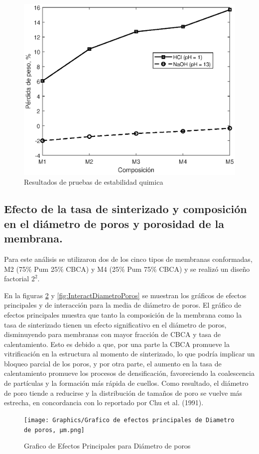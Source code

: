 \documentclass{article}
\begin{document}
\begin{figure}[ht]
    \centering
    \includegraphics[width=0.5\linewidth]{Graphics/ChemStability.eps}
    \caption{Resultados de pruebas de estabilidad quimica}
    \label{fig:EstabilidadQuimica}
\end{figure}

\subsection{Efecto de la tasa de sinterizado y composición en el diámetro de poros y porosidad de la membrana. }

Para este análisis se utilizaron dos de los cinco tipos de membranas 
conformadas, M2 (75\% Pum 25\% CBCA) y M4 (25\% Pum 75\% CBCA) y se 
realizó un diseño factorial $2^2$.

En la figuras \ref{fig:EfectosPrinDiametroPoros} y \ref{fig:InteractDiametroPoros} 
se muestran los gráficos de efectos principales 
y de interacción para la media de diámetro de poros. El gráfico de 
efectos principales muestra que tanto la composición de la membrana 
como la tasa de sinterizado tienen un efecto significativo en el 
diámetro de poros, disminuyendo para membranas con mayor fracción de 
CBCA y tasa de calentamiento. Esto es debido a que, por una parte la 
CBCA promueve la vitrificación en la estructura al momento de 
sinterizado, lo que podría implicar un bloqueo parcial de los poros, 
y por otra parte, el aumento en la tasa de calentamiento promueve los 
procesos de densificación, favoreciendo la coalescencia de partículas 
y la formación más rápida de cuellos. Como resultado, el diámetro de 
poro tiende a reducirse y la distribución de tamaños de poro se 
vuelve más estrecha, en concordancia con lo reportado por Chu et al. (1991). 

\begin{figure}[ht]
    \centering
    \texttt{[image: Graphics/Grafico de efectos principales de Diametro de poros, μm.png]}
    \caption{Grafico de Efectos Principales para Diámetro de poros}
    \label{fig:EfectosPrinDiametroPoros}
\end{figure}
\end{document}
